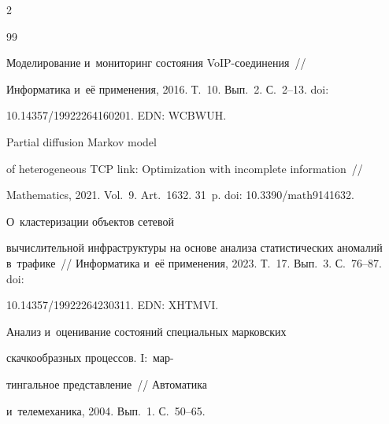 \begin{multicols}{2}
{{\begin{thebibliography}{99}


 Моделирование и~мониторинг состояния VoIP-со\-еди\-не\-ния~// 


Информатика и~её применения, 2016. Т.~10. Вып.~2. С.~2--13. doi: 


10.14357/19922264160201. EDN: WCBWUH.





 







 Partial diffusion Markov model 


of heterogeneous TCP link: Optimization with incomplete information~// 


Mathematics, 2021. Vol.~9. Art.~1632. 31~p. doi: 10.3390/math9141632.







 О~кластеризации объектов сетевой 


вычислительной инфраструктуры на основе анализа статистических аномалий в~трафике~// Информатика и~её применения, 2023. Т.~17. Вып.~3. С.~76--87. doi: 


10.14357/19922264230311. EDN: XHTMVI.










 Анализ и~оценивание состояний специальных марковских 


скачкообразных процессов. I:~мар-\linebreak\vspace*{-12pt}





\pagebreak





\noindent


тингальное представление~// Автоматика 


и~телемеханика, 2004. Вып.~1. С.~50--65. 








\end{thebibliography}}}
\end{multicols}
